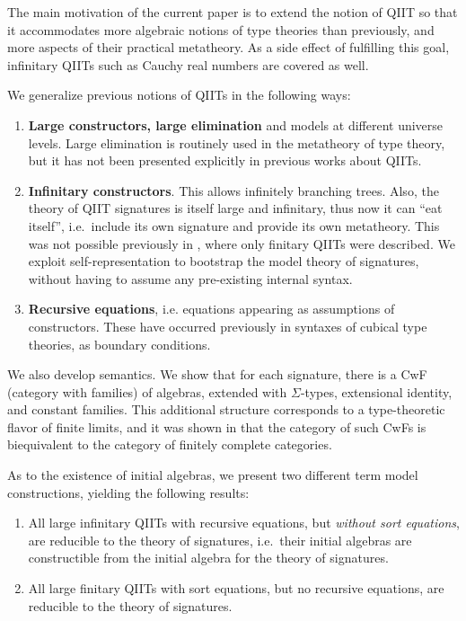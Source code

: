 \documentclass{llncs}
\begin{document}
The main motivation of the current paper is to extend the notion of QIIT so that
it accommodates more algebraic notions of type theories than previously, and
more aspects of their practical metatheory. As a side effect of fulfilling this
goal, infinitary QIITs such as Cauchy real numbers are covered as well.

We generalize previous notions of QIITs in the following ways:
\begin{enumerate}
  \item
  \textbf{Large constructors, large elimination} and models at different
  universe levels. Large elimination is routinely used in the metatheory of type
  theory, but it has not been presented explicitly in previous works about
  QIITs.
  \item
  \textbf{Infinitary constructors}. This allows infinitely branching
  trees. Also, the theory of QIIT signatures is itself large and infinitary,
  thus now it can ``eat itself'', i.e.\ include its own signature and provide
  its own metatheory. This was not possible previously in
  \cite{kaposi2019constructing}, where only finitary QIITs were described. We
  exploit self-representation to bootstrap the model theory of signatures,
  without having to assume any pre-existing internal syntax.
  \item
  \textbf{Recursive equations}, i.e. equations appearing as assumptions
  of constructors. These have occurred previously in syntaxes of cubical type
  theories, as boundary conditions\cite{TODO}.
\end{enumerate}

We also develop semantics. We show that for each signature, there is a CwF
(category with families) of algebras, extended with $\Sigma$-types, extensional
identity, and constant families. This additional structure corresponds to a
type-theoretic flavor of finite limits, and it was shown in \cite{TODO} that the
category of such CwFs is biequivalent to the category of finitely complete
categories.

As to the existence of initial algebras, we present two different term model
constructions, yielding the following results:

\begin{enumerate}
\item
  All large infinitary QIITs with recursive equations, but \emph{without
  sort equations}, are reducible to the theory of signatures, i.e.\
  their initial algebras are constructible from the initial algebra for
  the theory of signatures.
\item
  All large finitary QIITs with sort equations, but no recursive equations,
  are reducible to the theory of signatures.
\end{enumerate}
\end{document}
